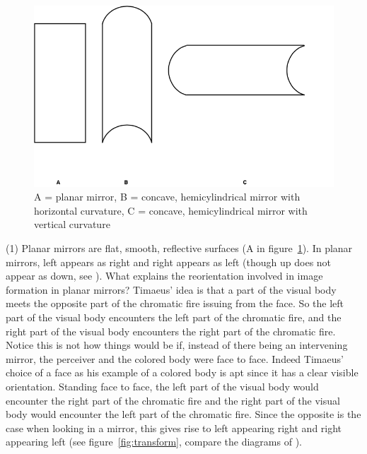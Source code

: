 \begin{figure}[htbp]
	\centering
		\includegraphics[scale=0.4]{graphics/mirror_type.png}
	\caption{A = planar mirror, B = concave, hemicylindrical mirror with horizontal curvature, C = concave, hemicylindrical mirror with vertical curvature}
	\label{fig:mirror_type}
\end{figure}

(1) Planar mirrors are flat, smooth, reflective surfaces (A in figure~\ref{fig:mirror_type}). In planar mirrors, left appears as right and right appears as left (though up does not appear as down, see \citealt{Block:1974tk}). What explains the reorientation involved in image formation in planar mirrors? Timae\-us' idea is that a part of the visual body meets the opposite part of the chromatic fire issuing from the face. So the left part of the visual body encounters the left part of the chromatic fire, and the right part of the visual body encounters the right part of the chromatic fire. Notice this is not how things would be if, instead of there being an intervening mirror, the perceiver and the colored body were face to face. Indeed Timaeus' choice of a face as his example of a colored body is apt since it has a clear visible orientation. Standing face to face, the left part of the visual body would encounter the right part of the chromatic fire and the right part of the visual body would encounter the left part of the chromatic fire. Since the opposite is the case when looking in a mirror, this gives rise to left appearing right and right appearing left (see figure~\ref{fig:transform}, compare the diagrams of \citealt[160 n1]{Archer-Hind:1888qd}).

